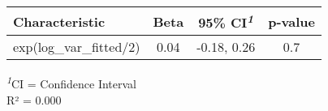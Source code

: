 
\fontsize{12.0pt}{14.4pt}\selectfont
\begin{tabular*}{\linewidth}{@{\extracolsep{\fill}}lccc}
\toprule
\textbf{Characteristic} & \textbf{Beta} & \textbf{95\% CI}\textsuperscript{\textit{1}} & \textbf{p-value} \\ 
\midrule\addlinespace[2.5pt]
exp(log\_var\_fitted/2) & 0.04 & -0.18, 0.26 & 0.7 \\ 
\bottomrule
\end{tabular*}
\begin{minipage}{\linewidth}
\textsuperscript{\textit{1}}CI = Confidence Interval\\
R² = 0.000\\
\end{minipage}



